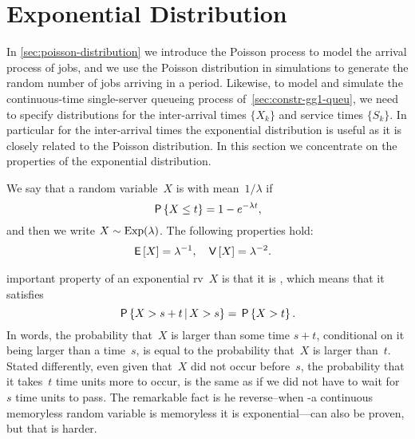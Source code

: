 \documentclass[stochastic-or.tex]{subfiles}
\begin{document}
\section{Exponential Distribution}
\label{sec:expon-distr}

In \cref{sec:poisson-distribution} we introduce the Poisson process to model the arrival process of jobs, and we use the Poisson distribution in simulations to generate the random number of jobs arriving in a period.
Likewise, to model and simulate the continuous-time single-server queueing process of~\cref{sec:constr-gg1-queu}, we need to specify distributions for the inter-arrival times $\{X_k\}$ and service times $\{S_k\}$.
In particular for the inter-arrival times the exponential distribution is useful as it is closely related to the Poisson distribution.
In this section we concentrate on the properties of the  exponential distribution.




We say that a random variable~$X$ is  with mean~$1/\lambda$ if
\begin{equation*}
 \P{X \leq t} = 1- e^{-\lambda t},
\end{equation*}
and then we write $X\sim \Exp{\lambda}$. The following properties hold:
\begin{subequations}
  \begin{align}
  \E X &= \lambda^{-1},  &  %
\V X &= \lambda^{-2}. %
\end{align}
\end{subequations}


 important property of an exponential rv~$X$ is that it is , which means that it satisfies
\begin{equation*}
 \P{X > s+t \given X>s} = \P{X>t}.
\end{equation*}
In words, the probability that~$X$ is larger than some time $s+t$, conditional on it being larger than a time~$s$, is equal to the probability that~$X$ is larger than~$t$.
Stated differently, even given that~$X$ did not occur before~$s$, the probability that it takes~$t$ time units more to occur, is the same as if we did not have to wait for~$s$ time units to pass.
The remarkable fact is he reverse--when -a continuous memoryless random variable is memoryless it is exponential---can also be proven, but that is harder.
\end{document}
